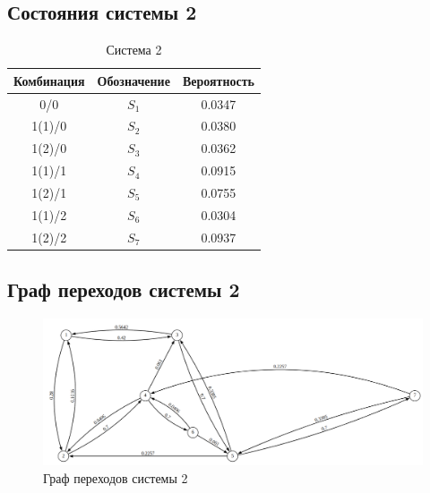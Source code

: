 \documentclass{article}
\begin{document}
\subsection*{Состояния системы 2}

\begin{table}[h]
    \centering
    \begin{tabular}{|c|c|c|}
    \hline
    Комбинация & Обозначение & Вероятность \\
    \hline
    0/0 & $S_1$ & 0.0347 \\
    1(1)/0 & $S_2$ & 0.0380 \\
    1(2)/0 & $S_3$ & 0.0362 \\
    1(1)/1 & $S_4$ & 0.0915 \\
    1(2)/1 & $S_5$ & 0.0755 \\
    1(1)/2 & $S_6$ & 0.0304 \\
    1(2)/2 & $S_7$ & 0.0937 \\
    \hline
    \end{tabular}
    \caption{Система 2}
    \label{tab:system2}
\end{table}
\subsection*{Граф переходов системы 2}


\begin{figure}[H]
    \centering
    \includegraphics[width=.9\textwidth]{image.png}
    \caption{Граф переходов системы 2}
    \label{fig:system2-graph}
\end{figure}
\end{document}
